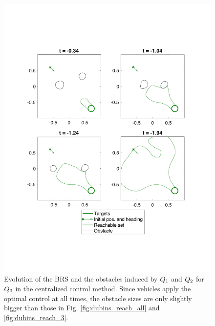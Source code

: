 \begin{figure}
  \centering
  \includegraphics[width=0.9\columnwidth]{fig/cc_rs3}
  \caption{Evolution of the BRS and the obstacles induced by $Q_1$ and $Q_2$ for $Q_3$ in the centralized control method. Since vehicles apply the optimal control at all times, the obstacle sizes are only slightly bigger than those in Fig. \ref{fig:dubins_reach_all} and \ref{fig:dubins_reach_3}.}
  \label{fig:cc_rs3}
\end{figure}
